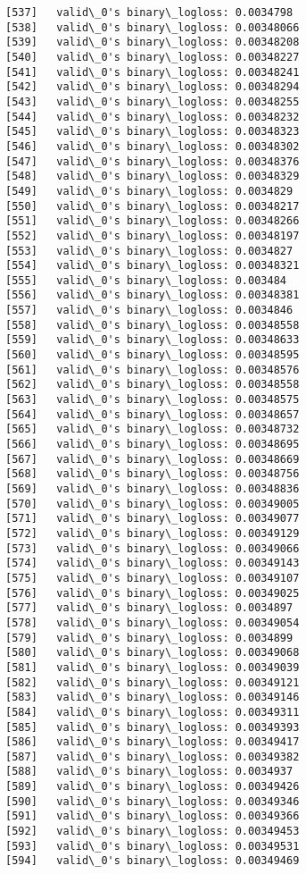 \documentclass[11pt]{article}
\begin{document}
\begin{Verbatim}[commandchars=\\\{\}]
[537]	valid\_0's binary\_logloss: 0.0034798
[538]	valid\_0's binary\_logloss: 0.00348066
[539]	valid\_0's binary\_logloss: 0.00348208
[540]	valid\_0's binary\_logloss: 0.00348227
[541]	valid\_0's binary\_logloss: 0.00348241
[542]	valid\_0's binary\_logloss: 0.00348294
[543]	valid\_0's binary\_logloss: 0.00348255
[544]	valid\_0's binary\_logloss: 0.00348232
[545]	valid\_0's binary\_logloss: 0.00348323
[546]	valid\_0's binary\_logloss: 0.00348302
[547]	valid\_0's binary\_logloss: 0.00348376
[548]	valid\_0's binary\_logloss: 0.00348329
[549]	valid\_0's binary\_logloss: 0.0034829
[550]	valid\_0's binary\_logloss: 0.00348217
[551]	valid\_0's binary\_logloss: 0.00348266
[552]	valid\_0's binary\_logloss: 0.00348197
[553]	valid\_0's binary\_logloss: 0.0034827
[554]	valid\_0's binary\_logloss: 0.00348321
[555]	valid\_0's binary\_logloss: 0.003484
[556]	valid\_0's binary\_logloss: 0.00348381
[557]	valid\_0's binary\_logloss: 0.0034846
[558]	valid\_0's binary\_logloss: 0.00348558
[559]	valid\_0's binary\_logloss: 0.00348633
[560]	valid\_0's binary\_logloss: 0.00348595
[561]	valid\_0's binary\_logloss: 0.00348576
[562]	valid\_0's binary\_logloss: 0.00348558
[563]	valid\_0's binary\_logloss: 0.00348575
[564]	valid\_0's binary\_logloss: 0.00348657
[565]	valid\_0's binary\_logloss: 0.00348732
[566]	valid\_0's binary\_logloss: 0.00348695
[567]	valid\_0's binary\_logloss: 0.00348669
[568]	valid\_0's binary\_logloss: 0.00348756
[569]	valid\_0's binary\_logloss: 0.00348836
[570]	valid\_0's binary\_logloss: 0.00349005
[571]	valid\_0's binary\_logloss: 0.00349077
[572]	valid\_0's binary\_logloss: 0.00349129
[573]	valid\_0's binary\_logloss: 0.00349066
[574]	valid\_0's binary\_logloss: 0.00349143
[575]	valid\_0's binary\_logloss: 0.00349107
[576]	valid\_0's binary\_logloss: 0.00349025
[577]	valid\_0's binary\_logloss: 0.0034897
[578]	valid\_0's binary\_logloss: 0.00349054
[579]	valid\_0's binary\_logloss: 0.0034899
[580]	valid\_0's binary\_logloss: 0.00349068
[581]	valid\_0's binary\_logloss: 0.00349039
[582]	valid\_0's binary\_logloss: 0.00349121
[583]	valid\_0's binary\_logloss: 0.00349146
[584]	valid\_0's binary\_logloss: 0.00349311
[585]	valid\_0's binary\_logloss: 0.00349393
[586]	valid\_0's binary\_logloss: 0.00349417
[587]	valid\_0's binary\_logloss: 0.00349382
[588]	valid\_0's binary\_logloss: 0.0034937
[589]	valid\_0's binary\_logloss: 0.00349426
[590]	valid\_0's binary\_logloss: 0.00349346
[591]	valid\_0's binary\_logloss: 0.00349366
[592]	valid\_0's binary\_logloss: 0.00349453
[593]	valid\_0's binary\_logloss: 0.00349531
[594]	valid\_0's binary\_logloss: 0.00349469

\end{Verbatim}
\end{document}
